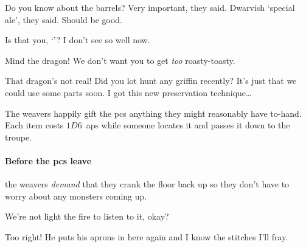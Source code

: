 \begin{multicols}{2}
\begin{speechtext}

  Do you know about the barrels?
  Very important, they said.
  Dwarvish `special ale', they said.
  Should be good.

  {\small
    Is that you, `\composeHumanName'?
    I don't see so well now.
  }

  \vspace{-.5em}
  {\large
    Mind the dragon!
    We don't want you to get \emph{too} roasty-toasty.
  }

  That dragon's not real!
  Did you lot hunt any \gls{griffin} recently?
  It's just that we could use some parts soon.
  I got this new preservation technique\ldots

  \vspace{-.3em}
\end{speechtext}

The \glspl{weaver} happily gift the \glspl{pc} anything they might reasonably have to-hand.
Each item costs $1D6$~\glspl{ap} while someone locates it and passes it down to the troupe.

\paragraph{Before the \glspl{pc} leave}
the \glspl{weaver} \emph{demand} that they crank the floor back up so they don't have to worry about any \glspl{monster} coming up.

\begin{speechtext}
  We're not light the fire to listen to it, okay?

  \vspace{-.4em}

  \vspace{-.4em}

  \vspace{-.3em}


  Too right!
  He puts his aprons in here again and I know the stitches I'll fray.

  \vspace{-.3em}


\end{speechtext}
\end{multicols}
